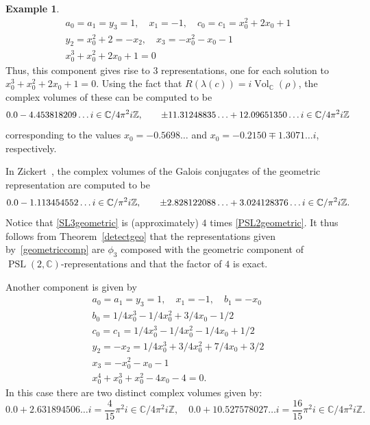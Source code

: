 \documentclass[11pt]{amsart}
\theoremstyle{definition}
\newtheorem{example}[theorem]{Example}
\numberwithin{equation}{section}
\def\printname#1{
        \if\draft y
                \smash{\makebox[0pt]{\hspace{-0.5in}
                        \raisebox{8pt}{\tt\tiny #1}}}
        \fi
}
\def\lbl#1{\label{#1}\printname{#1}}
\DeclareMathOperator{\Vol}{Vol}
\DeclareMathOperator{\PSL}{PSL}
\newcommand{\C}{\mathbb C}
\newcommand{\Z}{\mathbb Z}
\begin{document}
\begin{example}
\begin{equation}
\begin{gathered}
a_0=a_1=y_3=1,\quad x_1=-1, \quad c_0=c_1=x_0^2+2x_0+1\\
y_2=x_0^2+2=-x_2,\quad x_3=-x_0^2-x_0-1\\
x_0^3+x_0^2+2x_0+1=0 
\end{gathered}
\end{equation}
Thus, this component gives rise to $3$ representations, one for each 
solution to $x_0^3+x_0^2+2x_0+1=0$. Using the fact that 
$R(\lambda(c))=i\Vol_\C(\rho)$, the complex volumes of these can be 
computed to be
\begin{equation}
\lbl{SL3geometric} 
0.0-4.453818209\dots i\in\C/4\pi^2i\Z,
\qquad \pm 11.31248835\ldots+12.09651350\dots i\in\C/4\pi^2i\Z
\end{equation}
corresponding to the values $x_0=-0.5698\dots$ and 
$x_0=-0.2150\mp1.3071\dots i$, respectively. 

In Zickert~\cite[Section~6]{ZickertDuke}, the complex volumes of the 
Galois conjugates of the geometric representation are computed to be
\begin{equation}
\lbl{PSL2geometric}
0.0-1.113454552\ldots i\in\C/\pi^2i\Z,
\qquad \pm 2.828122088\ldots + 3.024128376\ldots i\in\C/\pi^2i\Z.
\end{equation}
Notice that \eqref{SL3geometric} is (approximately) $4$ times 
\eqref{PSL2geometric}. It thus follows from Theorem~\ref{detectgeo} 
that the representations given by~\eqref{geometriccomp} are $\phi_3$ 
composed with the geometric component of $\PSL(2,\C)$-representations 
and that the factor of $4$ is exact.

Another component is given by
\begin{equation}
\begin{gathered} 
a_0=a_1=y_3=1,\quad x_1=-1,\quad b_1=-x_0\\
b_0=1/4x_0^3-1/4x_0^2+3/4x_0-1/2\\
c_0=c_1=1/4x_0^3-1/4x_0^2-1/4x_0+1/2\\
y_2=-x_2=1/4x_0^3+3/4x_0^2+7/4x_0+3/2\\
x_3=-x_0^2-x_0-1\\
x_0^4+x_0^3+x_0^2-4x_0-4=0.  
\end{gathered}
\end{equation}
In this case there are two distinct complex volumes given by:
\begin{equation}
0.0+2.631894506\ldots i=\frac{4}{15}\pi^2i\in\C/4\pi^2i\Z,
\quad 0.0+10.527578027\ldots i=\frac{16}{15}\pi^2i\in\C/4\pi^2i\Z.
\end{equation}


\end{example}
\end{document}
